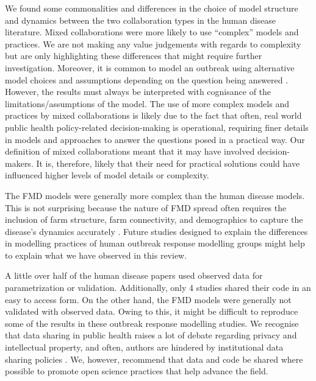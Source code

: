 \documentclass[10pt,letterpaper]{article}
\begin{document}
We found some commonalities and differences in the choice of model structure and dynamics between the two collaboration types in the human disease literature. Mixed collaborations were more likely to use ``complex'' models and practices. We are not making any value judgements with regards to complexity but are only highlighting these differences that might require further investigation. Moreover, it is common to model an outbreak using alternative model choices and assumptions depending on the question being answered \cite{Basu2013}. However, the results must always be interpreted with cognisance of the limitations/assumptions of the model.  The use of more complex models and practices by mixed collaborations is likely due to the fact that often, real world public health policy-related decision-making is operational, requiring finer details in models and approaches to answer the questions posed in a practical way. Our definition of mixed collaborations meant that it may have involved decision-makers. It is, therefore, likely that their need for practical solutions could have influenced higher levels of model details or complexity. 

The FMD models were generally more complex than the human disease models. This is not surprising because the nature of FMD spread often requires the inclusion of farm structure, farm connectivity, and demographics to capture the disease's dynamics accurately \cite{Kinsley2018}. Future studies designed to explain the differences in modelling practices of human outbreak response modelling groups might help to explain what we have observed in this review.

A little over half of the human disease papers used observed data for parametrization or validation. Additionally, only 4 studies shared their code in an easy to access form. On the other hand, the FMD models were generally not validated with observed data. Owing to this, it might be difficult to reproduce some of the results in these outbreak response modelling studies. We recognise that data sharing in public health raises a lot of debate regarding privacy and intellectual property, and often, authors are hindered by institutional data sharing policies \cite{Kim2016}. We, however, recommend that data and code be shared where possible to promote open science practices that help advance the field.  
\end{document}
